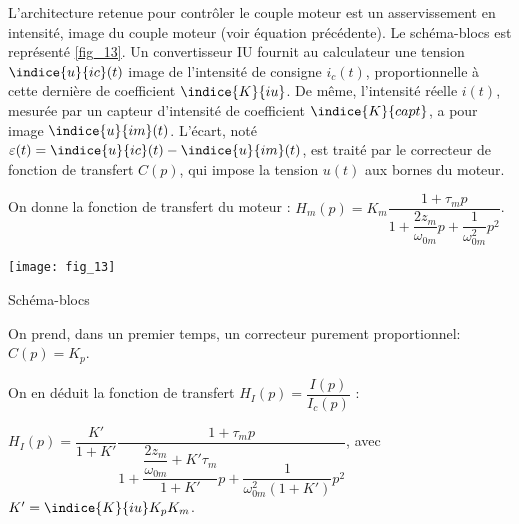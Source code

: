 \normaltrue \difficilefalse \tdifficilefalse
\correctionfalse

\setcounter{question}{0}%


\ifcorrection
\else
{}
\fi



\ifprof
\else

L’architecture retenue pour contrôler le couple moteur est un asservissement en intensité, image du
couple moteur (voir équation précédente). Le schéma-blocs est représenté \autoref{fig_13}. Un convertisseur IU
fournit au calculateur une tension $\indice{u}{ic}(t)$ image de l’intensité de consigne $i_c(t)$, proportionnelle à cette
dernière de coefficient $\indice{K}{iu}$. De même, l’intensité réelle $i(t)$, mesurée par un capteur d’intensité de
coefficient $\indice{K}{capt}$, a pour image $\indice{u}{im}(t)$. L’écart, noté $\varepsilon(t) = \indice{u}{ic}(t) - \indice{u}{im}(t)$, est traité par le correcteur de fonction de transfert $C(p)$, qui impose la tension $u(t)$ aux bornes du moteur.

On donne la fonction de transfert du moteur : $H_m(p)=K_m\dfrac{1+\tau_m p}{1+\dfrac{2z_m}{\omega_{0m}}p+\dfrac{1}{\omega_{0m}^2}p^2}$.


\begin{marginfigure}
\texttt{[image: fig\_13]}
\caption{Schéma-blocs \label{fig_13}}
\end{marginfigure}

\fi



\ifprof
\else
On prend, dans un premier temps, un correcteur purement proportionnel: $C(p)=K_p$.

On en déduit la fonction de transfert $H_I(p)=\dfrac{I(p)}{I_c(p)}$ :

$H_I(p)=\dfrac{K'}{1+K'}\dfrac{1+\tau_m p}{1+  
\dfrac{\dfrac{2z_m}{\omega_{0m}}+ K'\tau_m}{1+K'}p 
+ \dfrac{1}{\omega_{0m}^2(1+K')} p^2}$, avec $K'=\indice{K}{iu}K_pK_m$.

